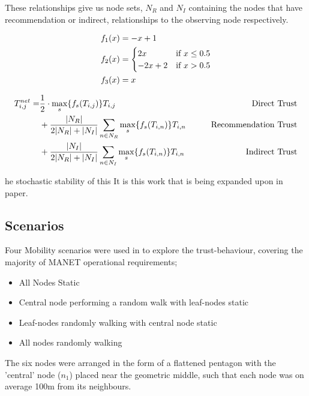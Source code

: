 \documentclass[runningheads,a4paper]{llncs}
\begin{document}
These relationships give us node sets, $N_R$ and $N_I$ containing the nodes that have recommendation or indirect, relationships to the observing node respectively.

\begin{align}
  \label{eq:whitenization}
  f_1(x) &= -x+1\notag\\
  f_2(x) &= 
  \begin{cases}
    2x & \text{if }x\leq 0.5\\
    -2x+2 & \text{if }x>0.5
  \end{cases}\\
  f_3(x) &= x\notag
\end{align}

\begin{align}
  \label{eq:networkeffects}
  T_{i,j}^{net}=&\frac{1}{2} \cdot \max_s\{f_s(T_{i,j})\} T_{i,j}&\qquad \text{Direct Trust}\notag \\
  &+ \frac{|N_R| }{2|N_R| + |N_I|}\sum_{n \in N_R} \max_s\{f_s(T_{i,n})\} T_{i,n}&\qquad \text{Recommendation Trust}\notag\\
  &+ \frac{|N_I| }{2|N_R| + |N_I|}\sum_{n \in N_I} \max_s\{f_s(T_{i,n})\} T_{i,n} &\qquad \text{Indirect Trust}
\end{align}

\cite{Guo11}he stochastic stability of this 
It is this work that is being expanded upon in paper.

\subsection{Scenarios}

Four Mobility scenarios were used in \cite{Guo11} to explore the trust-behaviour, covering the majority of MANET operational requirements; 

\begin{itemize}
  \item All Nodes Static
  \item Central node performing a random walk with leaf-nodes static
  \item Leaf-nodes randomly walking with central node static
  \item All nodes randomly walking
\end{itemize}

The six nodes were arranged in the form of a flattened pentagon with the 'central' node ($n_1$) placed near the geometric middle, such that each node was on average 100m from its neighbours.
\end{document}
